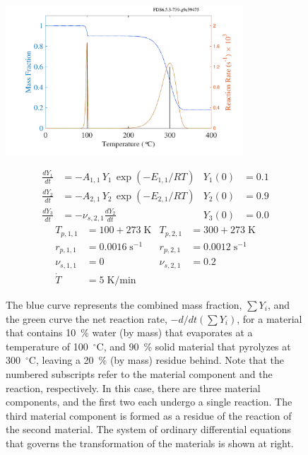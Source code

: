 \documentclass[11pt]{book}
\begin{document}
\begin{figure}[ht]
\noindent
\begin{minipage}{3.5in}
\includegraphics[width=3.5in]{SCRIPT_FIGURES/pyrolysis_2}
\end{minipage}
\hfill
\begin{minipage}{3.0in}
\footnotesize
\begin{align*}
   \frac{dY_1}{dt} &= -A_{1,1} \, Y_1 \, \exp(-E_{1,1}/RT)                  & Y_1(0) &=0.1 \\
   \frac{dY_2}{dt} &= -A_{2,1} \, Y_2 \, \exp(-E_{2,1}/RT)                  & Y_2(0) &=0.9 \\
   \frac{dY_3}{dt} &= -\nu_{s,2,1} \frac{dY_2}{dt}                          & Y_3(0) &=0.0
\end{align*}
\begin{align*}
   T_{p,1,1} &= 100+273 \; \mathrm{K}        & T_{p,2,1}   &= 300+273 \; \mathrm{K} \\
   r_{p,1,1} &= 0.0016 \; \mathrm{s}^{-1}    & r_{p,2,1}   &= 0.0012 \; \mathrm{s}^{-1} \\
   \nu_{s,1,1} &= 0                          & \nu_{s,2,1} &= 0.2 \\
   \dot{T} &= 5 \; \mathrm{K/min} & &
\end{align*}
\end{minipage} \normalsize
\caption[A more complicated demonstration of the pyrolysis model.]{The blue curve represents the combined mass fraction,
$\sum Y_i$, and the green curve the net reaction rate, $-d/dt(\sum Y_i)$, for a material that contains
10~\% water (by mass) that evaporates at a temperature of 100~$^\circ$C,
and 90~\% solid material that pyrolyzes at 300~$^\circ$C, leaving a 20~\% (by mass) residue behind.
Note that the numbered subscripts refer
to the material component and the reaction, respectively. In this case, there are three material components,
and the first two each undergo a single
reaction. The third material component is formed as a residue of the reaction of the second material.
The system of ordinary differential equations that governs
the transformation of the materials is shown at right.}
\label{pyrolysis_2}
\end{figure}
\end{document}
